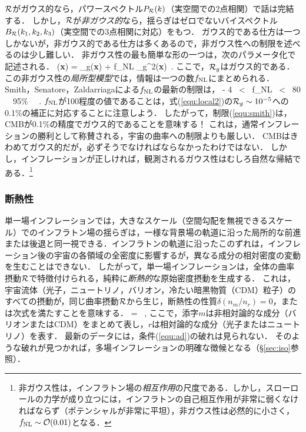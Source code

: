 ${\cal R}$がガウス的なら，パワースペクトル$P_{\cal R}(k)$（実空間での2点相関）で話は完結する．
しかし，${\cal R}$が{\it 非ガウス的}なら，揺らぎはゼロでないバイスペクトル$B_{\cal R}(k_1, k_2, k_3)$（実空間での3点相関に対応）をもつ．
ガウス的である仕方は一つしかないが，非ガウス的である仕方は多くあるので，非ガウス性への制限を述べるのは少し難しい．
非ガウス性の最も簡単な形の一つは，次のパラメータ化で記述される．
\beq
\label{equ:local2}
\R({\bf x}) = \R_g({\bf x}) +  f_{\rm NL} \star \R_g^2({\bf x})\, .
\eeq
ここで，${\cal R}_g$はガウス的である．この非ガウス性の{\it 局所型模型}では，情報は一つの数$f_{\rm NL}$にまとめられる．
Smith，Senatore，Zaldarriaga\cite{Smith:2009jr}による$f_{\rm NL}$の最新の制限は，
\beq
\label{equ:smith}
- 4 \ < \ f_{\rm NL} \ < \ 80 \quad {} \ \ 95\% \ \, .
\eeq
$f_{\rm NL}$が100程度の値であることは，式(\ref{equ:local2})の${\cal R}_g \sim 10^{-5}$への0.1\%の補正に対応することに注意しよう．
したがって，制限(\ref{equ:smith})は，CMBが0.1\%の精度でガウス的であることを意味する！ これは，通常インフレーションの勝利として称賛される，宇宙の曲率への制限よりも厳しい．
CMBはきわめてガウス的だが，必ずそうでなければならなかったわけではない．
しかし，インフレーションが正しければ，観測されるガウス性はむしろ自然な帰結である．\footnote{非ガウス性は，インフラトン場の{\it 相互作用}の尺度である．しかし，スローロールの力学が成り立つには，インフラトンの自己相互作用が非常に弱くなければならず（ポテンシャルが非常に平坦），非ガウス性は必然的に小さく，$f_{\rm NL} \sim {\cal O}(0.01)$となる\cite{malda}．}

\subsubsection{断熱性}

単一場インフレーションでは，大きなスケール（空間勾配を無視できるスケール）でのインフラトン場の揺らぎは，一様な背景場の軌道に沿った局所的な前進または後退と同一視できる．インフラトンの軌道に沿ったこのずれは，インフレーション後の宇宙の各領域の全密度に影響するが，異なる成分の相対密度の変動を生むことはできない．
したがって，単一場インフレーションは，全体の曲率摂動${\cal R}$で特徴付けられる，純粋に{\it 断熱的}な原始密度摂動を生成する．
これは，宇宙流体（光子，ニュートリノ，バリオン，冷たい暗黒物質（CDM）粒子）のすべての摂動が，同じ曲率摂動${\cal R}$から生じ，断熱性の性質$\delta(n_m/n_r) =0$，または次式を満たすことを意味する．
\beq
\label{equ:ad}
 =  \, ,
\eeq
ここで，添字$m$は非相対論的な成分（バリオンまたはCDM）をまとめて表し，$r$は相対論的な成分（光子またはニュートリノ）を表す．
最新のデータには，条件(\ref{equ:ad})の破れは見られない\cite{WMAP5}．
そのような破れが見つかれば，多場インフレーションの明確な徴候となる（\S\ref{sec:iso}参照）．

